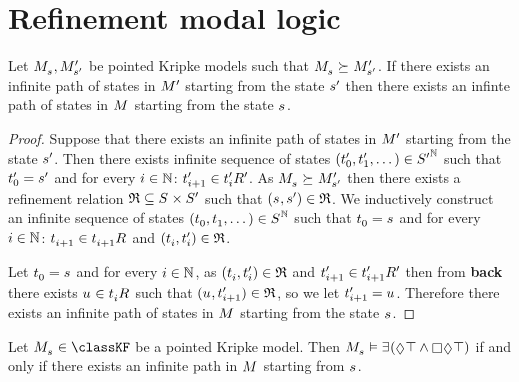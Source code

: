 \chapter{Refinement modal logic \classKF{}}\label{rml-k4}

\begin{lemma}\label{refinements-infinite-paths}
Let $\kPModel{\kStateS}, \kPModelP{\kStateSP}$ be pointed Kripke models such that $\kPModel{\kStateS} \simulates \kPModelP{\kStateSP}$.
If there exists an infinite path of states in ${M^{\prime}_{}}$ starting from the state ${s}^{\prime}$ then there exists an infinte path of states in $\kModel$ starting from the state $\kStateS$.
\end{lemma}

\begin{proof}
Suppose that there exists an infinite path of states in ${M^{\prime}_{}}$ starting from the state ${s}^{\prime}$.
Then there exists infinite sequence of states $({t}^{\prime}_0, {t}^{\prime}_1, \dots) \in {S^{\prime}}^{\mathbb{N}}$ such that ${t}^{\prime}_0 = {s}^{\prime}$ and for every $i \in \mathbb{N}$: ${t}^{\prime}_{i + 1} \in {{t}^{\prime}_i} {R^{\prime}_{}}$.
As $\kPModel{\kStateS} \simulates \kPModelP{\kStateSP}$ then there exists a refinement relation $\refinement \subseteq \kStates \times \kStatesP$ such that $(\kStateS, \kStateSP) \in \refinement$.
We inductively construct an infinite sequence of states $(\kStateT_0, \kStateT_1, \dots) \in \kStates^\naturals$ such that $\kStateT_0 = \kStateS$ and for every $i \in \mathbb{N}$: $\kStateT_{i + 1} \in \kSuccessors{}{\kStateT_{i + 1}}$ and $(\kStateT_i, \kStateTP_i) \in \refinement$.

Let $\kStateT_0 = \kStateS$ and for every $i \in \mathbb{N}$, as $(\kStateT_i, \kStateTP_i) \in \refinement$ and ${t}^{\prime}_{i + 1} \in {{t}^{\prime}_{i + 1}} {R^{\prime}_{}}$ then from {\bf back} there exists $\kStateU \in \kSuccessors{}{\kStateT_i}$ such that $(\kStateU, \kStateTP_{i + 1}) \in \refinement$, so we let $\kStateTP_{i + 1} = \kStateU$.
Therefore there exists an infinite path of states in $\kModel$ starting from the state $\kStateS$.
\end{proof}

\begin{lemma}\label{refinements-infinite-paths-formula}
Let $\kPModel{\kStateS} \in \classKF$ be a pointed Kripke model.
Then $\kPModel{\kStateS} \entails \somerefs(\possible \top \land \necessary \possible \top)$ if and only if there exists an infinite path in $\kModel$ starting from $\kStateS$.
\end{lemma}

